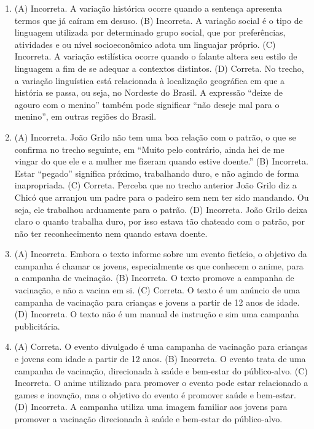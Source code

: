 \begin{enumerate}
\item (A) Incorreta. A variação histórica ocorre quando a sentença apresenta
termos que já caíram em desuso.
(B) Incorreta. A variação social é o tipo de linguagem utilizada por
determinado grupo social, que por preferências, atividades e ou nível
socioeconômico adota um linguajar próprio.
(C) Incorreta. A variação estilística ocorre quando o falante altera seu
estilo de linguagem a fim de se adequar a contextos distintos.
(D) Correta. No trecho, a variação linguística está relacionada à
localização geográfica em que a história se passa, ou seja, no Nordeste
do Brasil. A expressão ``deixe de agouro com o menino'' também pode
significar ``não deseje mal para o menino'', em outras regiões do
Brasil.

\item (A) Incorreta. João Grilo não tem uma boa relação com o patrão, o que se
confirma no trecho seguinte, em ``Muito pelo contrário, ainda hei de me
vingar do que ele e a mulher me fizeram quando estive doente.''
(B) Incorreta. Estar ``pegado'' significa próximo, trabalhando duro, e
não agindo de forma inapropriada.
(C) Correta. Perceba que no trecho anterior João Grilo diz a Chicó que
arranjou um padre para o padeiro sem nem ter sido mandando. Ou seja, ele
trabalhou arduamente para o patrão.
(D) Incorreta. João Grilo deixa claro o quanto trabalha duro, por isso
estava tão chateado com o patrão, por não ter reconhecimento nem quando
estava doente.

\item (A) Incorreta. Embora o texto informe sobre um evento fictício, o objetivo
  da campanha é chamar os jovens, especialmente os que conhecem o anime,
  para a campanha de vacinação.
(B) Incorreta. O texto promove a campanha de vacinação, e não a vacina em
si.
(C) Correta. O texto é um anúncio de uma campanha de vacinação para
crianças e jovens a partir de 12 anos de idade.
(D) Incorreta. O texto não é um manual de instrução e sim uma campanha
publicitária.

\item (A) Correta. O evento divulgado é uma campanha de vacinação para crianças
e jovens com idade a partir de 12 anos.
(B) Incorreta. O evento trata de uma campanha de vacinação, direcionada à
saúde e bem-estar do público-alvo.
(C) Incorreta. O anime utilizado para promover o evento pode estar
relacionado a games e inovação, mas o objetivo do evento é promover
saúde e bem-estar.
(D) Incorreta. A campanha utiliza uma imagem familiar aos jovens para
promover a vacinação direcionada à saúde e bem-estar do público-alvo.
\end{enumerate}
